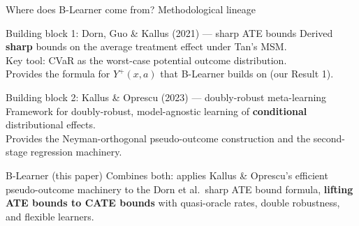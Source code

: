 \documentclass[aspectratio=169]{beamer}
\begin{document}
\begin{frame}{Where does B-Learner come from? Methodological lineage}

\begin{block}{Building block 1: Dorn, Guo \& Kallus (2021) --- sharp ATE bounds}
\small Derived \textbf{sharp} bounds on the average treatment effect under Tan's MSM.\\
Key tool: CVaR as the worst-case potential outcome distribution.\\
Provides the formula for $Y^+(x,a)$ that B-Learner builds on (our Result 1).
\end{block}

\smallskip
\begin{block}{Building block 2: Kallus \& Oprescu (2023) --- doubly-robust meta-learning}
\small Framework for doubly-robust, model-agnostic learning of \textbf{conditional} distributional effects.\\
Provides the Neyman-orthogonal pseudo-outcome construction and the second-stage regression machinery.
\end{block}

\smallskip
\begin{alertblock}{B-Learner (this paper)}
Combines both: applies Kallus \& Oprescu's efficient pseudo-outcome machinery to the Dorn et al.\ sharp ATE bound formula, \textbf{lifting ATE bounds to CATE bounds} with quasi-oracle rates, double robustness, and flexible learners.
\end{alertblock}
\end{frame}

\end{document}
